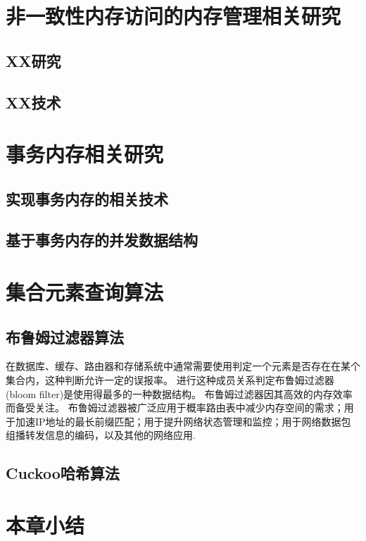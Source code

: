\section{非一致性内存访问的内存管理相关研究}

\subsection{XX研究}
\label{sec:}

\subsection{XX技术}

\section{事务内存相关研究}

\subsection{实现事务内存的相关技术}
\subsection{基于事务内存的并发数据结构}

\section{集合元素查询算法}

\subsection{布鲁姆过滤器算法}
在数据库、缓存、路由器和存储系统中通常需要使用判定一个元素是否存在在某个集合内，这种判断允许一定的误报率。
进行这种成员关系判定布鲁姆过滤器(bloom filter)是使用得最多的一种数据结构\cite{bloom1970space}。
布鲁姆过滤器因其高效的内存效率而备受关注。
布鲁姆过滤器被广泛应用于概率路由表中减少内存空间的需求\cite{yu2009buffalo}；用于加速IP地址的最长前缀匹配\cite{dharmapurikar2003longest}；用于提升网络状态管理和监控\cite{bonomi2006beyond,song2005fast}；用于网络数据包组播转发信息的编码\cite{jokela2009lipsin}，以及其他的网络应用\cite{broder2004network}.

\subsection{Cuckoo哈希算法}



\section{本章小结}


